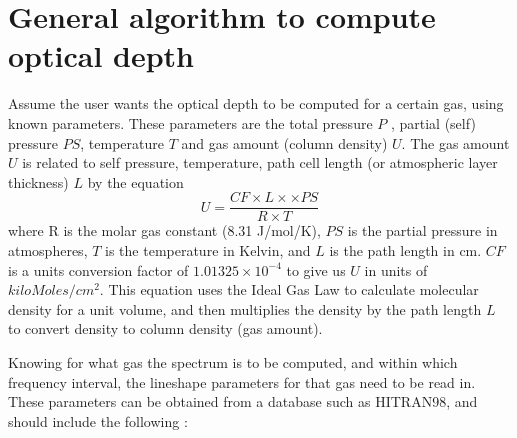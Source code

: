 \documentclass[11pt]{article}
\begin{document}
\newpage
\section{General algorithm to compute optical depth}
Assume the user wants the optical depth to be computed for a certain gas, 
using known parameters. These parameters are the total pressure $P$ , 
partial (self) pressure $PS$, temperature $T$ and gas amount (column
density) $U$. The gas amount $U$ is related to self pressure, temperature,
path cell length (or atmospheric layer thickness) $L$ by the equation 
\[ 
U = \frac{CF \times L \times \times PS}{R \times T}
\]
where R is the molar gas constant (8.31 J/mol/K), $PS$ is the partial
pressure in atmospheres, $T$ is the temperature in Kelvin, and $L$ is
the path length in cm.  $CF$ is a units conversion factor of
$1.01325 \times 10^{-4}$ to give us $U$ in units of $kiloMoles/cm^{2}$.
This equation uses the Ideal Gas Law to calculate molecular density
for a unit volume, and then multiplies the density by the path length
$L$ to convert density to column density (gas amount).
 
Knowing for what gas the spectrum is to be computed, and within which 
frequency interval, the lineshape parameters for that gas need to be read 
in. These  parameters can be obtained from a database such as HITRAN98, 
and should include the following : 
\end{document}
